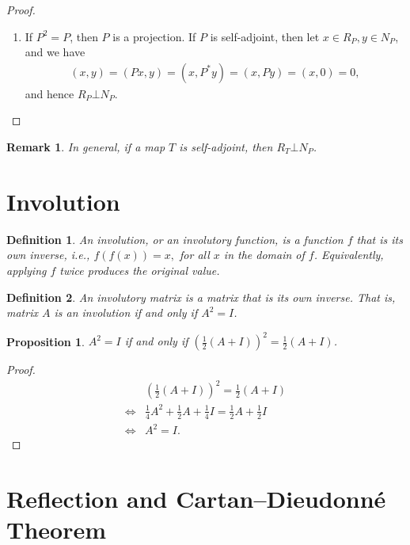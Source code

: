 \documentclass[11pt]{book}
\newtheorem{definition}{Definition}[chapter]
\newtheorem{proposition}{Proposition}[chapter]
\newtheorem{remark}{Remark}[chapter]
\theoremstyle{definition}
\numberwithin{equation}{chapter}
\begin{document}
\begin{subappendices}
\begin{proof}
\begin{enumerate}[label=(\alph*)]
    \item If $P^2 = P$, then $P$ is a projection. If $P$ is self-adjoint, then let $x \in R_P, y \in N_P$, and we have
    \begin{align*}
        (x, y) = (Px, y) = (x, P^*y) = (x, Py) = (x, 0) = 0,
    \end{align*}
    and hence $R_P \bot N_P$.
\end{enumerate}
\end{proof}

\begin{remark}
In general, if a map $T$ is self-adjoint, then $R_T \bot N_P$.
\end{remark}

\medskip

\section{Involution}
\begin{definition}
An involution, or an involutory function, is a function $f$ that is its own inverse, i.e., $f(f(x)) = x,$ for all $x$ in the domain of $f$. Equivalently, applying $f$ twice produces the original value.
\end{definition}

\medskip

\begin{definition}
An involutory matrix is a matrix that is its own inverse. That is, matrix $A$ is an involution if and only if $A^2 = I$.
\end{definition}

\medskip

\begin{proposition}
$A^2 = I$ if and only if $\left(\frac{1}{2} (A + I) \right)^2 = \frac{1}{2} (A + I)$.
\end{proposition}
\begin{proof}
\begin{align*}
    & \left(\frac{1}{2} (A + I) \right)^2 = \frac{1}{2}(A + I) \\
    \Longleftrightarrow & \frac{1}{4} A^2 + \frac{1}{2} A + \frac{1}{4} I = \frac{1}{2} A + \frac{1}{2} I \\
    \Longleftrightarrow & A^2 = I.
\end{align*}
\end{proof}

\medskip

\section{Reflection and Cartan–Dieudonné Theorem}\label{appendix_reflection}


\end{subappendices}
\end{document}
